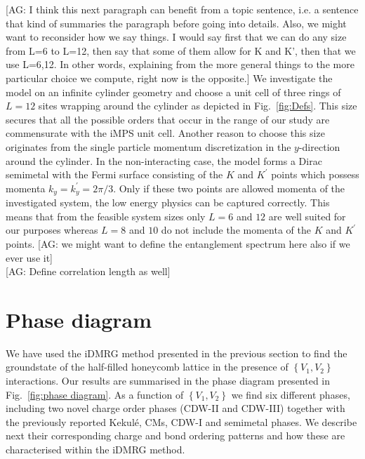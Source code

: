 \documentclass[aps,prx,10pt,twocolumn,floatfix,superscriptaddress,showpacs,numerical,footinbib]{revtex4-1}
\newcommand{\noteAG}[1]{{\color{blue} [AG: #1]}}
\begin{document}
\noteAG{I think this next paragraph can benefit from a topic sentence, i.e. a sentence that kind of summaries the paragraph before going into details.
Also, we might want to reconsider how we say things. I would say first that we can do any size from L=6 to L=12, then say that some of them allow for K and K', then that we use 
L=6,12. In other words, explaining from the more general things to the more particular choice we compute, right now is the opposite.}
We investigate the model on an infinite cylinder geometry and choose a unit cell of three rings of $L=12$ sites wrapping around the cylinder as depicted in Fig.~\ref{fig:Defs}. 
%
This size secures that all the possible orders that occur in the range of our study are commensurate with the iMPS unit cell. 
%
Another reason to choose this size originates from the single particle momentum discretization in the $y$-direction around the cylinder. 
%
In the non-interacting case, the model forms a Dirac semimetal with the Fermi surface consisting of the $K$ and $K^{\prime}$ points which possess momenta $k_y=k_y^{\prime} = 2\pi / 3$. 
%
Only if these two points are allowed momenta of the investigated system, the low energy physics can be captured correctly. 
%
This means that from the feasible system sizes only $L=6$ and $12$ are well suited for our purposes whereas $L=8$ and $10$ do not include the momenta of the $K$ and $K^{\prime}$ points.
%
\noteAG{we might want to define the entanglement spectrum here also if we ever use it}\\
\noteAG{Define correlation length as well}
%

\section{\label{sec:phasediagram}Phase diagram}
%
We have used the iDMRG method presented in the previous section
to find the groundstate of the half-filled honeycomb lattice in the presence of 
$\left\lbrace V_{1},V_{2}\right\rbrace$ interactions.
%
Our results are summarised in the phase diagram presented in Fig.~\ref{fig:phase diagram}.
%
As a function of $\left\lbrace V_{1},V_{2}\right\rbrace$ we find six different phases, 
including two novel charge order phases (CDW-II and CDW-III) together with the previously 
reported Kekul\'{e}, CMs, CDW-I and semimetal phases.
%
We describe next their corresponding charge and bond ordering patterns and how these
are characterised within the iDMRG method.
%
\end{document}
